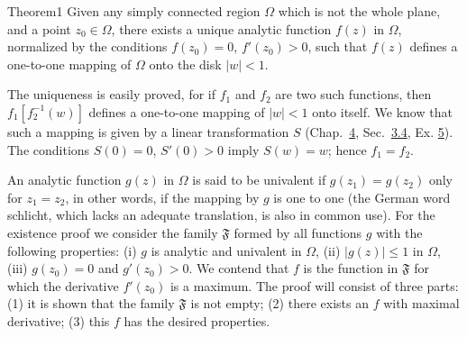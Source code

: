 \begin{originalstatement}{Theorem}{1}\label{thm:6.1}
Given any simply connected region $\Omega$ which is not the whole plane, and a point $z_0 \in \Omega$, there exists a unique analytic function $f(z)$ in $\Omega$, normalized by the conditions $f(z_0) = 0$, $f'(z_0) > 0$, such that $f(z)$ defines a one-to-one mapping of $\Omega$ onto the disk $|w| < 1$.
\end{originalstatement}
The uniqueness is easily proved, for if $f_1$ and $f_2$ are two such functions, then $f_1[f_2^{-1}(w)]$ defines a one-to-one mapping of $|w| < 1$ onto itself. We know that such a mapping is given by a linear transformation $S$ (Chap.~\hyperref[chap:4]{4}, Sec.~\hyperref[sec:4.3.4]{3.4}, Ex. \hyperref[exercise:4.3.4.7.5]{5}). The conditions $S(0) = 0$, $S'(0) > 0$ imply $S(w) = w$; hence $f_1 = f_2$.

An analytic function $g(z)$ in $\Omega$ is said to be univalent if $g(z_1) = g(z_2)$ only for $z_1 = z_2$, in other words, if the mapping by $g$ is one to one (the German word schlicht, which lacks an adequate translation, is also in common use). For the existence proof we consider the family $\mathfrak{F}$ formed by all functions $g$ with the following properties: (i) $g$ is analytic and univalent in $\Omega$, (ii) $|g(z)| \leq 1$ in $\Omega$, (iii) $g(z_0) = 0$ and $g'(z_0) > 0$. We contend that $f$ is the function in $\mathfrak{F}$ for which the derivative $f'(z_0)$ is a maximum. The proof will consist of three parts: (1) it is shown that the family $\mathfrak{F}$ is not empty; (2) there exists an $f$ with maximal derivative; (3) this $f$ has the desired properties.

